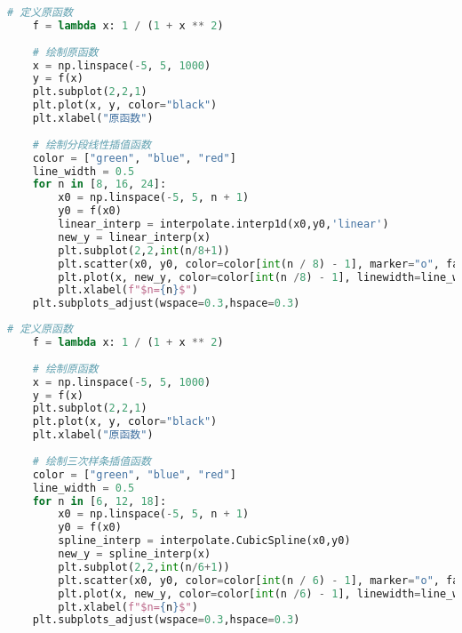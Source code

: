 \documentclass[withoutpreface]{cumcmthesis}
\begin{document}
    \begin{lstlisting}[language=python ,caption={分段线性插值} ]
    # 定义原函数
    f = lambda x: 1 / (1 + x ** 2)
    
    # 绘制原函数
    x = np.linspace(-5, 5, 1000)
    y = f(x)
    plt.subplot(2,2,1)
    plt.plot(x, y, color="black")
    plt.xlabel("原函数")
    
    # 绘制分段线性插值函数
    color = ["green", "blue", "red"]
    line_width = 0.5
    for n in [8, 16, 24]:
        x0 = np.linspace(-5, 5, n + 1)
        y0 = f(x0)
        linear_interp = interpolate.interp1d(x0,y0,'linear')
        new_y = linear_interp(x)
        plt.subplot(2,2,int(n/8+1))
        plt.scatter(x0, y0, color=color[int(n / 8) - 1], marker="o", facecolor="white", linewidth=line_width)
        plt.plot(x, new_y, color=color[int(n /8) - 1], linewidth=line_width)
        plt.xlabel(f"$n={n}$")
    plt.subplots_adjust(wspace=0.3,hspace=0.3)
    \end{lstlisting}

    \begin{lstlisting}[language=python ,caption={三次样条插值} ]
    # 定义原函数
    f = lambda x: 1 / (1 + x ** 2)
    
    # 绘制原函数
    x = np.linspace(-5, 5, 1000)
    y = f(x)
    plt.subplot(2,2,1)
    plt.plot(x, y, color="black")
    plt.xlabel("原函数")
    
    # 绘制三次样条插值函数
    color = ["green", "blue", "red"]
    line_width = 0.5
    for n in [6, 12, 18]:
        x0 = np.linspace(-5, 5, n + 1)
        y0 = f(x0)
        spline_interp = interpolate.CubicSpline(x0,y0)
        new_y = spline_interp(x)
        plt.subplot(2,2,int(n/6+1))
        plt.scatter(x0, y0, color=color[int(n / 6) - 1], marker="o", facecolor="white", linewidth=line_width)
        plt.plot(x, new_y, color=color[int(n /6) - 1], linewidth=line_width)
        plt.xlabel(f"$n={n}$")
    plt.subplots_adjust(wspace=0.3,hspace=0.3)
    \end{lstlisting}
\end{document}
